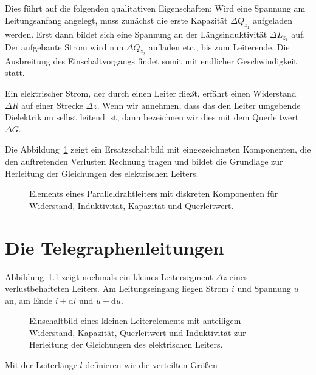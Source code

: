 \documentclass[paper=a4, parskip=half-, ngerman, fontsize=11pt]{scrreprt}
\begin{document}
Dies führt auf die folgenden qualitativen Eigenschaften: Wird eine Spannung am Leitungsanfang angelegt, muss zunächst
die erste Kapazität $\Delta Q_{z_{1}}$ aufgeladen werden. Erst dann bildet sich eine Spannung an der Längsinduktivität
$\Delta L_{z_{1}}$ auf. Der aufgebaute Strom wird nun $\Delta Q_{z_{2}}$ aufladen etc., bis zum Leiterende. Die
Ausbreitung des Einschaltvorgangs findet somit mit endlicher Geschwindigkeit statt.

Ein elektrischer Strom, der durch einen Leiter fließt, erfährt einen Widerstand $\Delta R$ auf einer Strecke
$\Delta z$. Wenn wir annehmen, dass das den Leiter umgebende Dielektrikum selbst leitend ist, dann bezeichnen wir
dies mit dem Querleitwert $\Delta G$.

Die Abbildung~\ref{Leitung3} zeigt ein Ersatzschaltbild mit eingezeichneten Komponenten, die den auftretenden Verlusten
Rechnung tragen und bildet die Grundlage zur Herleitung der Gleichungen des elektrischen Leiters.

\begin{figure}[!htb]
    \begin{center}
        
        \caption{Elements eines Paralleldrahtleiters mit diskreten Komponenten für Widerstand, Induktivität, Kapazität
        und Querleitwert.}
        \label{Leitung3}
    \end{center}
\end{figure}



\chapter{Die Telegraphenleitungen}
Abbildung~\ref{Leitung4} zeigt nochmals ein kleines Leitersegment $\Delta z$ eines verlustbehafteten Leiters. Am
Leitungseingang liegen Strom $i$ und Spannung $u$ an, am Ende \mbox{$i + \mathrm{d} i$} und
\mbox{$u + \mathrm{d} u$}.
\begin{figure}[!htb]
    \begin{center}
        
        \caption{Einschaltbild eines kleinen Leiterelements mit anteiligem Widerstand, Kapazität, Querleitwert und
        Induktivität zur Herleitung der Gleichungen des elektrischen Leiters.}
        \label{Leitung4}
    \end{center}
\end{figure}

Mit der Leiterlänge $l$ definieren wir die verteilten Größen
\end{document}
